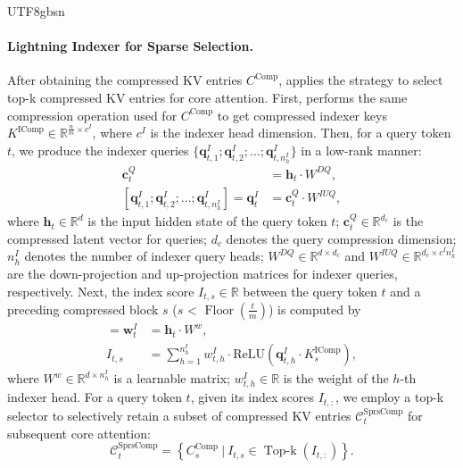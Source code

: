\begin{CJK*}{UTF8}{gbsn}
\paragraph{Lightning Indexer for Sparse Selection.}
After obtaining the compressed KV entries $C^{\text{Comp}}$, \csa{} applies the \dsa{} strategy to select top-k compressed KV entries for core attention. 
First, \csa{} performs the same compression operation used for $C^{\text{Comp}}$ to get compressed indexer keys $K^{\text{IComp}} \in \mathbb{R}^{\frac{n}{m} \times c^I}$, where $c^I$ is the indexer head dimension. 
Then, for a query token $t$, we produce the indexer queries $\{\mathbf{q}_{t, 1}^{I};\mathbf{q}_{t, 2}^{I};...;\mathbf{q}_{t, n_{h}^{I}}^{I}\}$ in a low-rank manner:
\begin{align}
    \mathbf{c}_{t}^{Q} &= \mathbf{h}_{t} \cdot W^{DQ}, \\
    [\mathbf{q}_{t, 1}^{I};\mathbf{q}_{t, 2}^{I};...;\mathbf{q}_{t, n_{h}^{I}}^{I}] = \mathbf{q}_{t}^{I} &= \mathbf{c}_{t}^{Q} \cdot W^{IUQ},
\end{align}
where $\mathbf{h}_{t} \in \mathbb{R}^{d}$ is the input hidden state of the query token $t$; $\mathbf{c}_{t}^{Q} \in \mathbb{R}^{d_c}$ is the compressed latent vector for queries; $d_c$ denotes the query compression dimension; $n_{h}^{I}$ denotes the number of indexer query heads; $W^{DQ} \in \mathbb{R}^{d \times d_c}$ and $W^{IUQ} \in \mathbb{R}^{d_c \times c^I n_h^I}$ are the down-projection and up-projection matrices for indexer queries, respectively.
Next, the index score $I_{t, s} \in \mathbb{R}$ between the query token $t$ and a preceding compressed block $s$ ($s$ < $\operatorname{Floor}(\frac{t}{m})$) is computed by
\begin{align}
    [w_{t, 1}^I; w_{t, 2}^I; ...; w_{t, n_{h}^{I}}^I] = \mathbf{w}_t^I & = \mathbf{h}_{t} \cdot W^w, \\
    I_{t, s} & = \sum_{h=1}^{n_h^I} w_{t, h}^I \cdot \text{ReLU}\left(\mathbf{q}^{I}_{t, h} \cdot K^{\text{IComp}}_{s}\right),
\end{align}
where $W^w \in \mathbb{R}^{d \times n_{h}^{I}}$ is a learnable matrix; $w_{t, h}^I \in \mathbb{R}$ is the weight of the $h$-th indexer head.
For a query token $t$, given its index scores $I_{t, :}$, we employ a top-k selector to selectively retain a subset of compressed KV entries $\mathcal{C}^{\text{SprsComp}}_t$ for subsequent core attention:
\begin{equation}
    \mathcal{C}^{\text{SprsComp}}_t = \left\{ C^{\text{Comp}}_{s} ~\Big|~ I_{t, s} \in \operatorname{Top-k} (I_{t, :}) \right\}.
\end{equation}


\end{CJK*}
